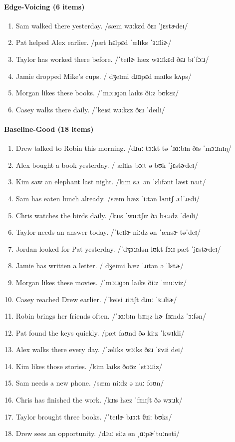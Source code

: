 \documentclass[12pt]{article}
\begin{document}
\paragraph{Edge-Voicing (6 items)}
\begin{enumerate}
\item Sam walked there yesterday. /sæm wɔːkɛd ðɛɹ ˈjɛstɚdeɪ/
\item Pat helped Alex earlier. /pæt hɛlpɛd ˈælɪks ˈɜːɹliɚ/
\item Taylor has worked there before. /ˈteɪlɚ hæz wɜːɹkɛd ðɛɹ bɪˈfɔːɹ/
\item Jamie dropped Mike's cups. /ˈdʒeɪmi dɹɑpɛd maɪks kʌps/
\item Morgan likes these books. /ˈmɔːɹɡən laɪks ðiːz bʊkɛz/
\item Casey walks there daily. /ˈkeɪsi wɔːkɛz ðɛɹ ˈdeɪli/
\end{enumerate}

\paragraph{Baseline-Good (18 items)}
\begin{enumerate}
\item Drew talked to Robin this morning. /dɹuː tɔːkt tə ˈɹɑːbɪn ðɪs ˈmɔːɹnɪŋ/
\item Alex bought a book yesterday. /ˈælɪks bɔːt ə bʊk ˈjɛstɚdeɪ/
\item Kim saw an elephant last night. /kɪm sɔː ən ˈɛlɪfənt læst naɪt/
\item Sam has eaten lunch already. /sæm hæz ˈiːtən lʌntʃ ɔːlˈɹɛdi/
\item Chris watches the birds daily. /kɹɪs ˈwɑːtʃɪz ðə bɜːɹdz ˈdeɪli/
\item Taylor needs an answer today. /ˈteɪlɚ niːdz ən ˈænsɚ təˈdeɪ/
\item Jordan looked for Pat yesterday. /ˈdʒɔːɹdən lʊkt fɔːɹ pæt ˈjɛstɚdeɪ/
\item Jamie has written a letter. /ˈdʒeɪmi hæz ˈɹɪtən ə ˈlɛtɚ/
\item Morgan likes these movies. /ˈmɔːɹɡən laɪks ðiːz ˈmuːviz/
\item Casey reached Drew earlier. /ˈkeɪsi ɹiːtʃt dɹuː ˈɜːɹliɚ/
\item Robin brings her friends often. /ˈɹɑːbɪn bɹɪŋz hɚ fɹɛndz ˈɔːfən/
\item Pat found the keys quickly. /pæt faʊnd ðə kiːz ˈkwɪkli/
\item Alex walks there every day. /ˈælɪks wɔːks ðɛɹ ˈɛvɹi deɪ/
\item Kim likes those stories. /kɪm laɪks ðoʊz ˈstɔːɹiz/
\item Sam needs a new phone. /sæm niːdz ə nuː foʊn/
\item Chris has finished the work. /kɹɪs hæz ˈfɪnɪʃt ðə wɜːɹk/
\item Taylor brought three books. /ˈteɪlɚ bɹɔːt θɹiː bʊks/
\item Drew sees an opportunity. /dɹuː siːz ən ˌɑːpɚˈtuːnəti/
\end{enumerate}
\end{document}
